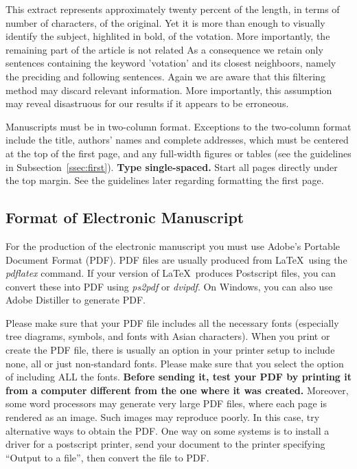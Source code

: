 \documentclass[11pt]{article}
\begin{document}
This extract represents approximately twenty percent of the length, in terms of number of characters, of the original. Yet it is more than enough to visually identify the subject, highlited in bold, of the votation. More importantly, the remaining part of the article is not related 
As a consequence we retain only sentences containing the keyword 'votation' and its closest neighboors, namely the preciding and following sentences. Again we are aware that this filtering method may discard relevant information. More importantly, this assumption may reveal disastruous for our results if it appears to be erroneous.

Manuscripts must be in two-column format.  Exceptions to the
two-column format include the title, authors' names and complete
addresses, which must be centered at the top of the first page, and
any full-width figures or tables (see the guidelines in
Subsection~\ref{ssec:first}). {\bf Type single-spaced.}  Start all
pages directly under the top margin. See the guidelines later
regarding formatting the first page.

\subsection{Format of Electronic Manuscript}
\label{sect:pdf}

For the production of the electronic manuscript you must use Adobe's
Portable Document Format (PDF). PDF files are usually produced from
\LaTeX\ using the \textit{pdflatex} command. If your version of
\LaTeX\ produces Postscript files, you can convert these into PDF
using \textit{ps2pdf} or \textit{dvipdf}. On Windows, you can also use
Adobe Distiller to generate PDF.

Please make sure that your PDF file includes all the necessary fonts
(especially tree diagrams, symbols, and fonts with Asian
characters). When you print or create the PDF file, there is usually
an option in your printer setup to include none, all or just
non-standard fonts.  Please make sure that you select the option of
including ALL the fonts. \textbf{Before sending it, test your PDF by
  printing it from a computer different from the one where it was
  created.} Moreover, some word processors may generate very large PDF
files, where each page is rendered as an image. Such images may
reproduce poorly. In this case, try alternative ways to obtain the
PDF. One way on some systems is to install a driver for a postscript
printer, send your document to the printer specifying ``Output to a
file'', then convert the file to PDF.
\end{document}
